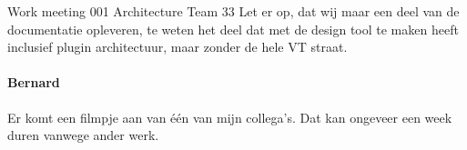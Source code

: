 \documentclass[a4paper,final]{article}
\begin{document}
\begin{Minutes}{Work meeting 001 Architecture Team 33}
Let er op, dat wij maar een deel van de documentatie opleveren, te weten 
het deel dat met de design tool te maken heeft inclusief plugin architectuur,
maar zonder de hele VT straat.


\paragraph{Bernard} Er komt een filmpje aan van \'{e}\'{e}n van mijn
collega's. Dat kan ongeveer een week duren vanwege ander werk.


\end{Minutes}
\end{document}
